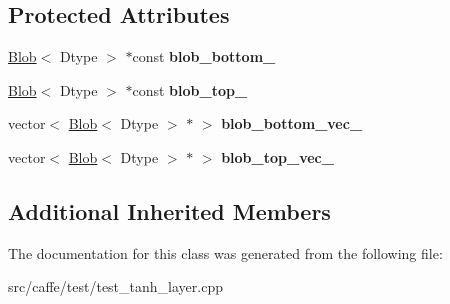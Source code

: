 \subsection*{Protected Attributes}
\begin{DoxyCompactItemize}
\item 
\mbox{\label{classcaffe_1_1_tan_h_layer_test_a47e507044e69bbbd93792337a007d816}} 
\mbox{\hyperlink{classcaffe_1_1_blob}{Blob}}$<$ Dtype $>$ $\ast$const {\bfseries blob\+\_\+bottom\+\_\+}
\item 
\mbox{\label{classcaffe_1_1_tan_h_layer_test_a3ac8fd69f1a94024d638b177594126f5}} 
\mbox{\hyperlink{classcaffe_1_1_blob}{Blob}}$<$ Dtype $>$ $\ast$const {\bfseries blob\+\_\+top\+\_\+}
\item 
\mbox{\label{classcaffe_1_1_tan_h_layer_test_a9960150b06628b85131e4922d7e8c4fa}} 
vector$<$ \mbox{\hyperlink{classcaffe_1_1_blob}{Blob}}$<$ Dtype $>$ $\ast$ $>$ {\bfseries blob\+\_\+bottom\+\_\+vec\+\_\+}
\item 
\mbox{\label{classcaffe_1_1_tan_h_layer_test_a82a236a635520e1a2b0fc3a0216ca03b}} 
vector$<$ \mbox{\hyperlink{classcaffe_1_1_blob}{Blob}}$<$ Dtype $>$ $\ast$ $>$ {\bfseries blob\+\_\+top\+\_\+vec\+\_\+}
\end{DoxyCompactItemize}
\subsection*{Additional Inherited Members}


The documentation for this class was generated from the following file\+:\begin{DoxyCompactItemize}
\item 
src/caffe/test/test\+\_\+tanh\+\_\+layer.\+cpp\end{DoxyCompactItemize}
